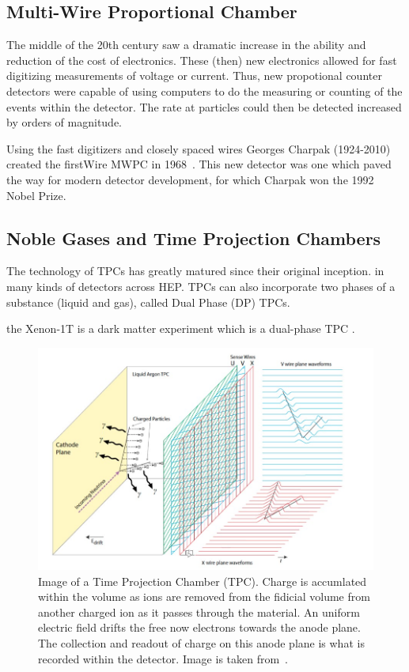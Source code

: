 \subsection{Multi-Wire Proportional Chamber}

The middle of the 20th century saw a dramatic increase in the ability and reduction of the cost of electronics.
These (then) new electronics allowed for fast digitizing measurements of voltage or current.
Thus, new propotional counter detectors were capable of using computers to do the measuring or counting of the events within the detector.
The rate at particles could then be detected increased by orders of magnitude.

Using the fast digitizers and closely spaced wires Georges Charpak (1924-2010) created the firstWire MWPC in 1968~\citep{Charpak:1968kd}.
This new detector was one which paved the way for modern detector development, for which Charpak won the 1992 Nobel Prize.

\subsection{Noble Gases and Time Projection Chambers}

The technology of TPCs has greatly matured since their original inception.
in many kinds of detectors across HEP. TPCs can also incorporate two phases of a substance (liquid and gas), called Dual Phase (DP) TPCs.

the Xenon-1T is a dark matter experiment which is a dual-phase TPC \citep{Aprile_2017_xenon1T}.

\begin{figure}[]
\centering
\includegraphics[width=\textwidth]{images/dune_tdrv12020_lartpc-sp.jpg}
\caption{Image of a Time Projection Chamber (TPC).
Charge is accumlated within the volume as ions are removed from the fidicial volume from another charged ion as it passes through the material.
An uniform electric field drifts the free now electrons towards the anode plane.
The collection and readout of charge on this anode plane is what is recorded within the detector.
Image is taken from~\citep{DUNE_TDR_V1_Abi_2020}.}
\end{figure}~\label{fig:dune_apa}

